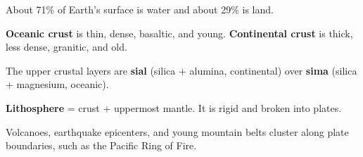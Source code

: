 \begin{gradebody}
\kf
\begin{keyfacts}
\item About 71\% of Earth's surface is water and about 29\% is land.
\item \textbf{Oceanic crust} is thin, dense, basaltic, and young. \textbf{Continental crust} is thick, less dense, granitic, and old.
\item The upper crustal layers are \textbf{sial} (silica + alumina, continental) over \textbf{sima} (silica + magnesium, oceanic).
\item \textbf{Lithosphere} = crust + uppermost mantle. It is rigid and broken into plates.
\item Volcanoes, earthquake epicenters, and young mountain belts cluster along plate boundaries, such as the Pacific Ring of Fire.
\end{keyfacts}
\cards
{}


\end{gradebody}
